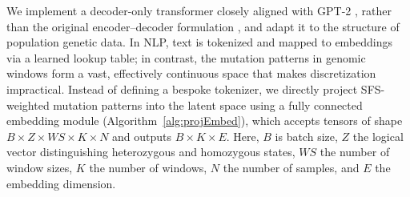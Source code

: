 \documentclass{article}
\let\citep\parencite
\begin{document}
{

We implement a decoder-only transformer closely aligned with GPT-2 \citep{radford_language_2019}, 
rather than the original encoder–decoder formulation \citep{vaswani_attention_2017}, 
and adapt it to the structure of population genetic data. 
In NLP, text is tokenized and mapped to embeddings via a learned lookup table; 
in contrast, the mutation patterns in genomic windows form a vast,
effectively continuous space that makes discretization impractical. 
Instead of defining a bespoke tokenizer,
we directly project SFS-weighted mutation patterns into the latent space using a fully connected embedding module (Algorithm~\ref{alg:projEmbed}),
which accepts tensors of shape $B \times Z \times WS \times K \times N$ and outputs $B \times K \times E$. 
Here, $B$ is batch size, $Z$ the logical vector distinguishing heterozygous and homozygous states, $WS$ the number of window sizes, $K$ the number of windows, $N$ the number of samples, and $E$ the embedding dimension.

}
\end{document}
